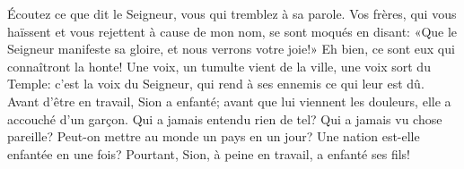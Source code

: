 Écoutez ce que dit le Seigneur, vous qui tremblez à sa parole.
Vos frères, qui vous haïssent et vous rejettent à cause de mon nom,
	se sont moqués en disant:
	«Que le Seigneur manifeste sa gloire, et nous verrons votre joie!»
	Eh bien, ce sont eux qui connaîtront la honte!
Une voix, un tumulte vient de la ville, une voix sort du Temple:
	c’est la voix du Seigneur, qui rend à ses ennemis ce qui leur est dû.
Avant d’être en travail, Sion a enfanté;
	avant que lui viennent les douleurs, elle a accouché d’un garçon.
Qui a jamais entendu rien de tel? Qui a jamais vu chose pareille?
	Peut-on mettre au monde un pays en un jour?
	Une nation est-elle enfantée en une fois?
	Pourtant, Sion, à peine en travail, a enfanté ses fils!
